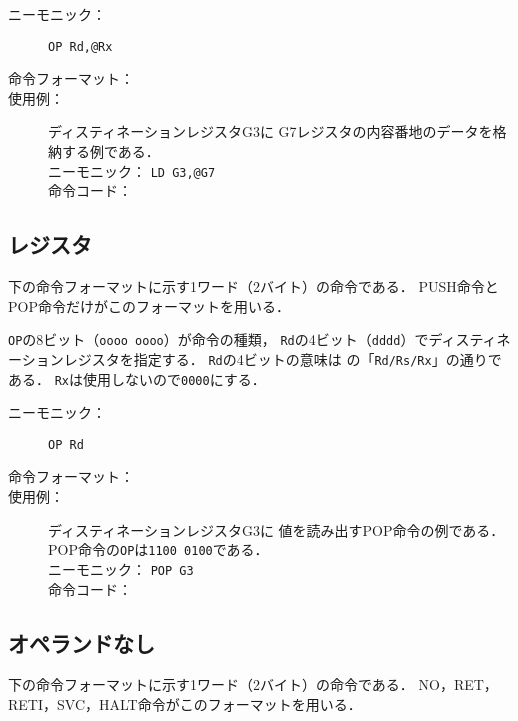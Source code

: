 \begin{description}
\item[ニーモニック：] \texttt{OP Rd,@Rx}

\item[命令フォーマット：] %

\item[使用例：] ディスティネーションレジスタG3に
G7レジスタの内容番地のデータを格納する例である．\\
ニーモニック： \texttt{LD G3,@G7}\\
命令コード：
\end{description}

\subsection{レジスタ}
下の命令フォーマットに示す1ワード（2バイト）の命令である．
PUSH命令とPOP命令だけがこのフォーマットを用いる．

\texttt{OP}の8ビット（\texttt{oooo oooo}）が命令の種類，
\texttt{Rd}の4ビット（\texttt{dddd}）でディスティネーションレジスタを指定する．
\texttt{Rd}の4ビットの意味は
の「\texttt{Rd/Rs/Rx}」の通りである．
\texttt{Rx}は使用しないので\texttt{0000}にする．

\begin{description}
\item[ニーモニック：] \texttt{OP Rd}

\item[命令フォーマット：] %

\item[使用例：] ディスティネーションレジスタG3に
値を読み出すPOP命令の例である．\\ 
POP命令の\texttt{OP}は\texttt{1100 0100}である．\\
ニーモニック： \texttt{POP G3}\\
命令コード：
\end{description}

\subsection{オペランドなし}
下の命令フォーマットに示す1ワード（2バイト）の命令である．
NO，RET，RETI，SVC，HALT命令がこのフォーマットを用いる．

